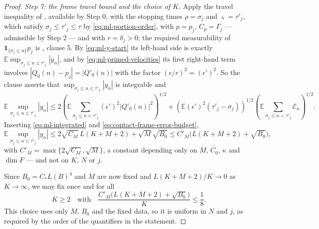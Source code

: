 \begin{proof}
\emph{Step 7: the frame travel bound and the choice of $K$.}
Apply the travel inequality of , available by
Step 0, with the stopping times $\rho=\sigma_j$ and $\varsigma=\tau'_j$, which
satisfy $\sigma_j\le\tau'_j\le\tau$ by \eqref{eq:ml-portion-order}, with
$p=p_j$, $C_p=\Gamma_j$ --- admissible by Step 2 --- and with $r=\delta_j>0$;
the required measurability of $\mathbf1_{\{\sigma_j\le n\}}p_j$ is
, clause 5. By \eqref{eq:ml-y-start} its left-hand side is
exactly $\mathbb E\sup_{\sigma_j\le n\le\tau'_j}|y_n|$, and by
\eqref{eq:ml-primed-velocities} its first right-hand term involves
$|Q_0(n)-p_j|=|Q'_0(n)|$ with the factor $(\epsilon/r)^2=(\epsilon')^2$. So the
clause asserts that $\sup_{\sigma_j\le n\le\tau'_j}|y_n|$ is integrable and
\[
  \mathbb E\sup_{\sigma_j\le n\le\tau'_j}|y_n|
   \le2\left(\mathbb E\sum_{\sigma_j\le n<\tau'_j}
        (\epsilon')^2|Q'_0(n)|^2\right)^{1/2}
     +\left(\mathbb E(\epsilon')^2(\tau'_j-\sigma_j)\right)^{1/2}
      \left(\mathbb E\sum_{\sigma_j\le n<\tau'_j}\mathcal E_n\right)^{1/2}.
\]
Inserting \eqref{eq:ml-integrated} and
\eqref{eq:contact-frame-error-budget},
\begin{equation}\label{eq:contact-frame-travel}
  \mathbb E\sup_{\sigma_j\le n\le\tau'_j}|y_n|
   \le2\sqrt{C_M}\,L(K+M+2)+\sqrt{M}\sqrt{B_0}
   \le C'_M\bigl(L(K+M+2)+\sqrt{B_0}\bigr),
\end{equation}
with $C'_M=\max\{2\sqrt{C_M},\sqrt M\}$, a constant depending only on $M$,
$C_0$, $\kappa$ and $\dim F$ --- and not on $K$, $N$ or $j$.

Since $B_0=C_*L(B)^4$ and $M$ are now fixed and
$L(K+M+2)/K\to0$ as $K\to\infty$, we may fix once and for all
\begin{equation}\label{eq:ml-choiceK}
  K\ge2\quad\text{with}\quad
  \frac{C'_M\bigl(L(K+M+2)+\sqrt{B_0}\bigr)}{K}\le\frac18 .
\end{equation}
This choice uses only $M$, $B_0$ and the fixed data, so it is uniform in $N$
and $j$, as required by the order of the quantifiers in the statement.


\end{proof}
